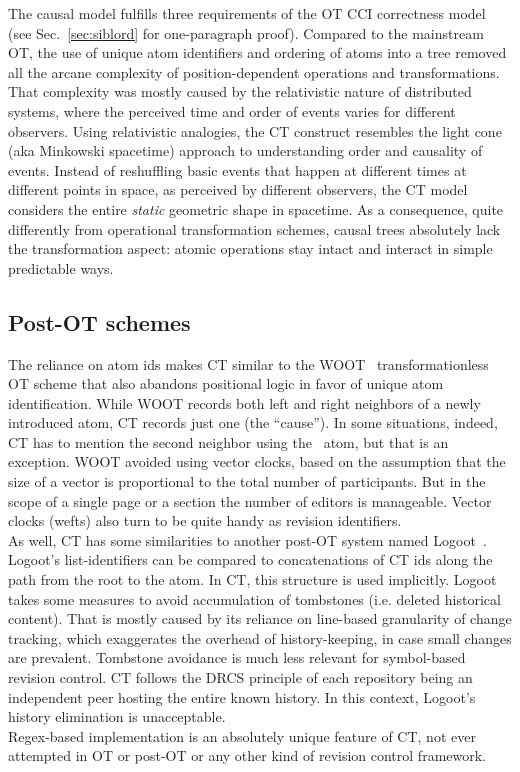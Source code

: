 \documentclass{sig-alternate}
\begin{document}
The causal model fulfills three requirements of the OT CCI correctness model (see Sec.~\ref{sec:siblord} for one-paragraph proof).
Compared to the mainstream OT, the use of unique atom identifiers and  ordering of atoms into a tree removed all the arcane complexity of position-dependent operations and transformations.
That complexity was mostly caused by the relativistic nature of distributed systems, where the perceived time and order of events varies for different observers.
Using relativistic analogies, the CT construct resembles the light cone (aka Minkowski spacetime) approach to understanding order and causality of events.
Instead of reshuffling basic events that happen at different times at different points in space, as perceived by different observers, the CT model considers the entire \emph{static} geometric shape in spacetime.
As a consequence, quite differently from operational transformation schemes, causal trees absolutely lack the transformation aspect: atomic operations stay intact and interact in simple predictable ways.

\subsection{Post-OT schemes}
The reliance on atom ids makes CT similar to the WOOT~\cite{woot} transformationless OT scheme that also abandons positional logic in favor of unique atom identification.
While WOOT records both left and right neighbors of a newly introduced atom, CT records just one (the ``cause''). 
In some situations, indeed, CT has to mention the second neighbor using the \zero ~atom, but that is an exception.
WOOT avoided using vector clocks, based on the assumption that the size of a vector is proportional to the total number of participants.
But in the scope of a single page or a section the number of editors is manageable. Vector clocks (wefts) also turn to be quite handy as revision identifiers. \\
As well, CT has some similarities to another post-OT system named Logoot~\cite{logoot}.
Logoot's list-identifiers can be compared to concatenations of CT ids along the path from the root to the atom.
In CT, this structure is used implicitly.
Logoot takes some measures to avoid accumulation of tombstones (i.e. deleted historical content). That is mostly caused by its reliance on line-based granularity of change tracking, which exaggerates the overhead of history-keeping, in case small changes are prevalent.
Tombstone avoidance is much less relevant for symbol-based revision control.
CT follows the DRCS principle of each repository being an independent peer hosting the entire known history.
In this context, Logoot's history elimination is unacceptable. \\
Regex-based implementation is an absolutely unique feature of CT, not ever attempted in OT or post-OT or any other kind of revision control framework.
\end{document}
